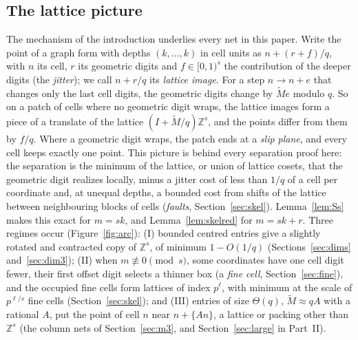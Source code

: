 \documentclass[11pt]{amsart}
\theoremstyle{definition}
\theoremstyle{plain}
\newcommand{\Z}{\mathbb{Z}}
\begin{document}
\subsection{The lattice picture}
The mechanism of the introduction underlies every net in this paper. Write the point of a graph form with depths $(k,\dots,k)$ in cell units as $n+(r+f)/q$, with $n$ its cell, $r$ its geometric digits and $f\in[0,1)^s$ the contribution of the deeper digits (the \emph{jitter}); we call $n+r/q$ its \emph{lattice image}. For a step $n\to n+e$ that changes only the last cell digits, the geometric digits change by $\tilde Me$ modulo $q$. So on a patch of cells where no geometric digit wraps, the lattice images form a piece of a translate of the lattice $(I+\tilde M/q)\Z^s$, and the points differ from them by $f/q$. Where a geometric digit wraps, the patch ends at a \emph{slip plane}, and every cell keeps exactly one point. This picture is behind every separation proof here: the separation is the minimum of the lattice, or union of lattice cosets, that the geometric digit realizes locally, minus a jitter cost of less than $1/q$ of a cell per coordinate and, at unequal depths, a bounded cost from shifts of the lattice between neighbouring blocks of cells (\emph{faults}, Section~\ref{sec:skel}). Lemma~\ref{lem:Ss} makes this exact for $m=sk$, and Lemma~\ref{lem:skelred} for $m=sk+r$. Three regimes occur (Figure~\ref{fig:arc}): (I) bounded centred entries give a slightly rotated and contracted copy of $\Z^s$, of minimum $1-O(1/q)$ (Sections~\ref{sec:dims} and~\ref{sec:dim3}); (II) when $m\not\equiv0\pmod s$, some coordinates have one cell digit fewer, their first offset digit selects a thinner box (a \emph{fine cell}, Section~\ref{sec:fine}), and the occupied fine cells form lattices of index $p^\ell$, with minimum at the scale of $p^{\ell/s}$ fine cells (Section~\ref{sec:skel}); and (III) entries of size $\Theta(q)$, $\tilde M\approx qA$ with a rational $A$, put the point of cell $n$ near $n+\{An\}$, a lattice or packing other than $\Z^s$ (the column nets of Section~\ref{sec:m3}, and Section~\ref{sec:large} in Part~II).
\end{document}
